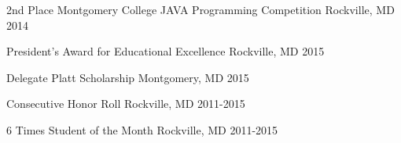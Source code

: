 



\begin{cvhonors}

  \cvhonor
    {2nd Place}
    {Montgomery College JAVA Programming Competition}
    {Rockville, MD}
    {2014}

  \cvhonorSimple
    {}
    {President's Award for Educational Excellence}
    {Rockville, MD}
    {2015}

  \cvhonorSimple
    {}
    {Delegate Platt Scholarship}
    {Montgomery, MD}
    {2015}

  \cvhonor
    {Consecutive}
    {Honor Roll}
    {Rockville, MD}
    {2011-2015}

  \cvhonor
    {6 Times}
    {Student of the Month}
    {Rockville, MD}
    {2011-2015}
\end{cvhonors}



